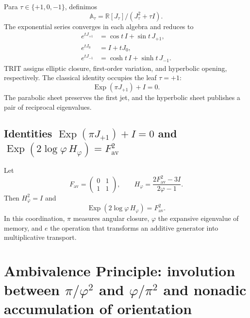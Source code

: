 Para \(\tau\in\{+1,0,-1\}\), definimos
\begin{equation}
 \mathbb A_\tau
 =\mathbb R[J_\tau]/(J_\tau^2+\tau I).
 \label{eq:l9s102:euler-algebras}
\end{equation}
The exponential series converges in each algebra and reduces to
\begin{align}
 e^{tJ_{+1}}&=\cos t\,I+\sin t\,J_{+1},
 \label{eq:l9s102:euler-eliptica}\\
 e^{tJ_0}&=I+tJ_0,
 \label{eq:l9s102:euler-parabolica}\\
 e^{tJ_{-1}}&=\cosh t\,I+\sinh t\,J_{-1}.
 \label{eq:l9s102:euler-hiperbolica}
\end{align}
TRIT assigns elliptic closure, first-order variation, and
hyperbolic opening, respectively. The classical identity occupies the leaf \(\tau=+1\):
\begin{equation}
 \boxed{\operatorname{Exp}(\pi J_{+1})+I=0.}
 \label{eq:l9s102:euler-clasica}
\end{equation}
The parabolic sheet preserves the first jet, and the hyperbolic sheet publishes
a pair of reciprocal eigenvalues.

\subsection{Identities \texorpdfstring{\(\operatorname{Exp}(\pi J_{+1})+I=0\)}{Exp(pi J+1)+I=0} and \texorpdfstring{\(\operatorname{Exp}(2\log\varphi\,H_\varphi)=F_{\mathrm{av}}^2\)}{Exp(2 log phi H_phi)=F_av^2}}

Let
\begin{equation}
 F_{\mathrm{av}}=\begin{pmatrix}0&1\\1&1\end{pmatrix},
 \qquad
 H_\varphi=\frac{2F_{\mathrm{av}}^2-3I}{2\varphi-1}.
 \label{eq:l9s102:euler-hphi}
\end{equation}
Then \(H_\varphi^2=I\) and
\begin{equation}
 \boxed{
 \operatorname{Exp}(2\log\varphi\,H_\varphi)=F_{\mathrm{av}}^2.}
 \label{eq:l9s102:euler-fav}
\end{equation}
In this coordination, \(\pi\) measures angular closure, \(\varphi\) the
expansive eigenvalue of memory, and \(e\) the operation that transforms an
additive generator into multiplicative transport.

\section{Ambivalence Principle: involution between \texorpdfstring{\(\pi/\varphi^2\)}{pi/phi^2} and \texorpdfstring{\(\varphi/\pi^2\)}{phi/pi^2} and nonadic accumulation of orientation}
\label{sec:l9s102:euler-ambivalencia}

